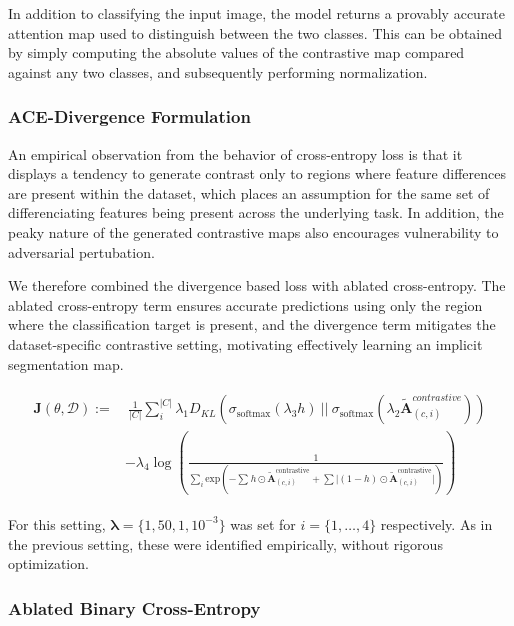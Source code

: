 \documentclass{article}
\theoremstyle{plain}
\theoremstyle{definition}
\theoremstyle{remark}
\begin{document}
In addition to classifying the input image, the model returns a provably accurate attention map used to distinguish between the two classes. This can be obtained by simply computing the absolute values of the contrastive map compared against any two classes, and subsequently performing normalization.

\subsubsection{ACE-Divergence Formulation}

An empirical observation from the behavior of cross-entropy loss is that it displays a tendency to generate contrast only to regions where feature differences are present within the dataset, which places an assumption for the same set of differenciating features being present across the underlying task. In addition, the peaky nature of the generated contrastive maps also encourages vulnerability to adversarial pertubation.

We therefore combined the divergence based loss with ablated cross-entropy. The ablated cross-entropy term ensures accurate predictions using only the region where the classification target is present, and the divergence term mitigates the dataset-specific contrastive setting, motivating effectively learning an implicit segmentation map.

\begin{gather}
	\begin{split}
		\mathcal{\bm{J}}(\theta, \mathcal{D}) := &\ \frac{1}{|C|} \sum^{|C|}_{i} \lambda_1 D_{KL}(\sigma_{\text{softmax}}(\lambda_3 h)\ ||\ \sigma_{\text{softmax}}(\lambda_2 \tilde{\mathcal{\bm{A}}}^{\textit{contrastive}}_{(c, i)})) \\
		&- \lambda_4 \log \left( \frac{1}{\sum_i \text{exp}\left({-\sum^{}h \odot \tilde{\mathcal{\bm{A}}}^{\text{contrastive}}_{(c, i)} + \sum |(1-h) \odot \tilde{\mathcal{\bm{A}}}^{\text{contrastive}}_{(c, i)}}|\right)} \right)
	\end{split}
\end{gather}

For this setting, $\bm{\lambda} = \{1, 50, 1, 10^{-3}\}$ was set for $i = \{1, \ldots, 4\}$ respectively. As in the previous setting, these were identified empirically, without rigorous optimization.

\subsubsection{Ablated Binary Cross-Entropy}
\end{document}
